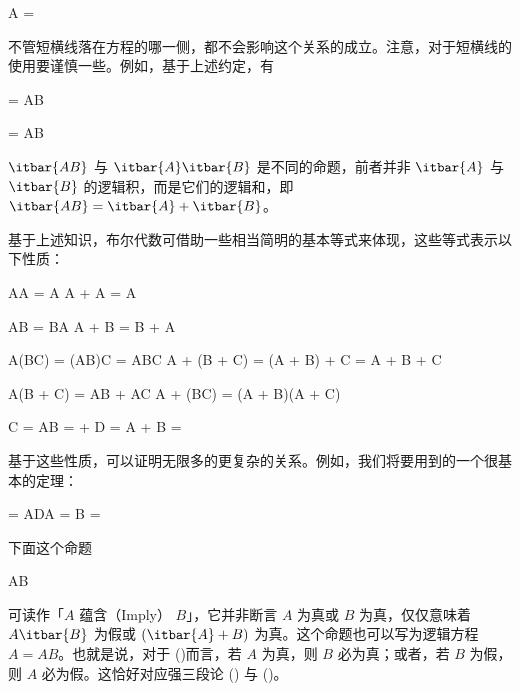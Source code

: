 \placeformula
\startformula
A = 
\stopformula

不管短横线落在方程的哪一侧，都不会影响这个关系的成立。注意，对于短横线的使用要谨慎一些。例如，基于上述约定，有

\placeformula
\startformula
{} = AB
\stopformula

\placeformula
\startformula
{} = AB
\stopformula

$\itbar{AB}$ 与 $\itbar{A}\itbar{B}$ 是不同的命题，前者并非 $\itbar{A}$ 与 $\itbar{B}$ 的逻辑积，而是它们的逻辑和，即 $\itbar{AB} = \itbar{A} + \itbar{B}$。

基于上述知识，布尔代数可借助一些相当简明的基本等式来体现，这些等式表示以下性质：

\placeformula[1-12]
\startformula
\startalign[n=2,align={left,left}]
\NC{}
\NC\quad\startmathcases
    \NC AA = A\NR
    \NC A + A = A\NR
\stopmathcases\NR

\NC{}
\NC\quad\startmathcases
    \NC AB = BA\NR
    \NC A + B = B + A\NR
\stopmathcases\NR
				   
\NC{}
\NC\quad\startmathcases
    \NC A(BC) = (AB)C = ABC\NR
    \NC A + (B + C) = (A + B) + C = A + B + C\NR
\stopmathcases\NR

\NC{}
\NC\quad\startmathcases
    \NC A(B + C) = AB + AC\NR
    \NC A + (BC) = (A + B)(A + C)\NR
\stopmathcases\NR

\NC{}
\NC\quad\startmathcases
    \NC{} C = AB  =  + \NR
    \NC {} D = A + B  = \NR
\stopmathcases\NR
\stopalign
\stopformula

基于这些性质，可以证明无限多的更复杂的关系。例如，我们将要用到的一个很基本的定理：

\placeformula
\startformula
{} = ADA = B = 
\stopformula

\blank[big]
\blank[small]

下面这个命题

\placeformula[implication]
\startformula
A\Rightarrow B
\stopformula

可读作「$A$ 蕴含（Imply） $B$」，它并非断言 $A$ 为真或 $B$ 为真，仅仅意味着 $A\itbar{B}$ 为假或 $(\itbar{A} + B)$ 为真。这个命题也可以写为逻辑方程 $A = AB$。也就是说，对于 (\in[implication])而言，若 $A$ 为真，则 $B$ 必为真；或者，若 $B$ 为假，则 $A$ 必为假。这恰好对应强三段论 (\in[syllogism-1]) 与 (\in[syllogism-2])。

